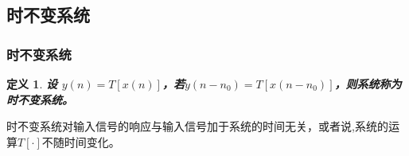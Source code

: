 \documentclass[notheorems,compress,mathserif,table]{beamer}
\newtheorem{definition}{定义}
\begin{document}
\subsection{时不变系统}

\begin{frame}\frametitle{时不变系统}%


\begin{definition}
\textbf{设 $y(n) = T[x(n)]$，若$y(n-n_{0})=T[x(n-n_{0})]$，则系统称为时不变系统。}
\end{definition}
\quad\newline\quad
时不变系统对输入信号的响应与输入信号加于系统的时间无关，或者说,系统的运算$T[\cdot]$不随时间变化。
\end{frame}
\end{document}

